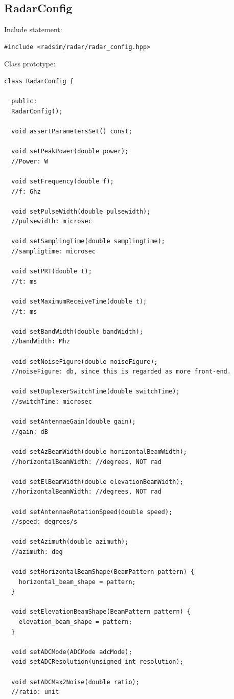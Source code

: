 \documentclass[letterpaper]{book}
\begin{document}
\subsection{RadarConfig}
\label{chap:radar_config}
Include statement:
\begin{lstlisting}
#include <radsim/radar/radar_config.hpp>
\end{lstlisting}
Class prototype:
\begin{lstlisting}
class RadarConfig {

  public:
  RadarConfig();

  void assertParametersSet() const;

  void setPeakPower(double power);
  //Power: W

  void setFrequency(double f);
  //f: Ghz

  void setPulseWidth(double pulsewidth);
  //pulsewidth: microsec

  void setSamplingTime(double samplingtime);
  //sampligtime: microsec

  void setPRT(double t);
  //t: ms

  void setMaximumReceiveTime(double t);
  //t: ms

  void setBandWidth(double bandWidth);
  //bandWidth: Mhz

  void setNoiseFigure(double noiseFigure);
  //noiseFigure: db, since this is regarded as more front-end.
    
  void setDuplexerSwitchTime(double switchTime);
  //switchTime: microsec   

  void setAntennaeGain(double gain);
  //gain: dB

  void setAzBeamWidth(double horizontalBeamWidth);
  //horizontalBeamWidth: //degrees, NOT rad

  void setElBeamWidth(double elevationBeamWidth);
  //horizontalBeamWidth: //degrees, NOT rad

  void setAntennaeRotationSpeed(double speed);
  //speed: degrees/s

  void setAzimuth(double azimuth);
  //azimuth: deg

  void setHorizontalBeamShape(BeamPattern pattern) {
    horizontal_beam_shape = pattern;
  }

  void setElevationBeamShape(BeamPattern pattern) {
    elevation_beam_shape = pattern;
  }

  void setADCMode(ADCMode adcMode);
  void setADCResolution(unsigned int resolution);

  void setADCMax2Noise(double ratio);
  //ratio: unit


\end{lstlisting}
\end{document}
